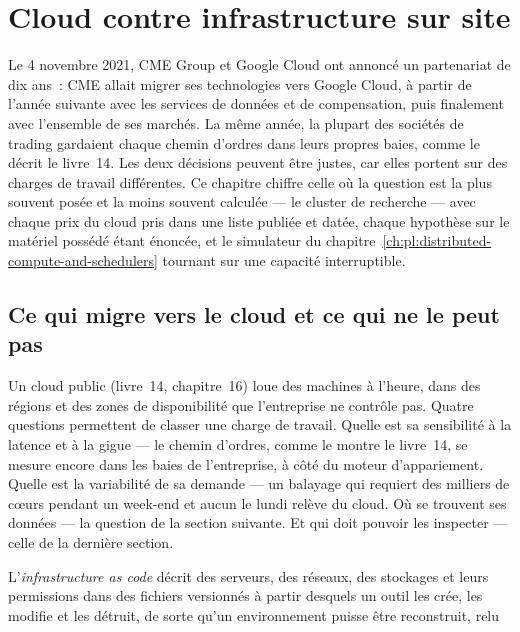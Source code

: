 \chapter{Cloud contre infrastructure sur site}\label{ch:pl:cloud-against-on-premises}

Le 4 novembre 2021, CME Group et Google Cloud ont annoncé un partenariat de dix ans~: CME allait migrer ses technologies vers Google Cloud, à
partir de l'année suivante avec les services de données et de compensation, puis finalement avec l'ensemble de ses marchés. La même année, la plupart des sociétés de trading gardaient chaque chemin d'ordres dans leurs
propres baies, comme le décrit le livre~14. Les deux décisions peuvent être justes, car elles portent sur des charges de travail différentes. Ce chapitre chiffre celle où la
question est la plus souvent posée et la moins souvent calculée --- le cluster de recherche --- avec chaque prix du cloud pris dans une liste publiée et datée,
chaque hypothèse sur le matériel possédé étant énoncée, et le simulateur du chapitre~\ref{ch:pl:distributed-compute-and-schedulers} tournant sur une
capacité interruptible.

\section{Ce qui migre vers le cloud et ce qui ne le peut pas}

Un cloud public (livre~14, chapitre~16) loue des machines à l'heure, dans des régions et des zones de disponibilité que l'entreprise ne contrôle pas. Quatre questions
permettent de classer une charge de travail. Quelle est sa sensibilité à la latence et à la gigue --- le chemin d'ordres, comme le montre le livre~14, se mesure encore dans les baies de l'entreprise, à côté
du moteur d'appariement. Quelle est la variabilité de sa demande --- un balayage qui requiert des milliers de cœurs pendant un week-end et aucun le lundi
relève du cloud. Où se trouvent ses données --- la question de la section suivante. Et qui doit pouvoir les inspecter --- celle de la dernière section.

\begin{definition}\label{def:pl:cloud-against-on-premises:iac}
L'\emph{infrastructure as code} décrit des serveurs, des réseaux, des stockages et leurs permissions dans des
fichiers versionnés à partir desquels un outil les crée, les modifie et les détruit, de sorte qu'un environnement puisse être reconstruit, relu
\end{definition}


